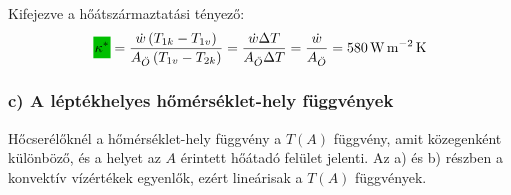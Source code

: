 Kifejezve a hőátszármaztatási tényező:
\begin{equation}
	\highlight{green!75!black}{\kappa^*} 
	= 
	\dfrac{\dot{w} \left(T_{1k} - T_{1v}\right)}{A_{\ddot{O}} \left(T_{1v} - T_{2k}\right)} 
	= 
	\dfrac{\dot{w} \Delta T}{A_{\ddot{O}} \Delta T} 
	= 
	\dfrac{\dot{w}}{A_{\ddot{O}}} = \SI{580}{\watt\per\meter\squared\kelvin}
\end{equation}

\subsubsection*{c) A léptékhelyes hőmérséklet-hely függvények}
Hőcserélőknél a hőmérséklet-hely függvény a $T\!\left(A\right)$ függvény, amit közegenként különböző, és a helyet az $A$ érintett hőátadó felület jelenti. Az a) és b) részben a konvektív vízértékek egyenlők, ezért lineárisak a $T\!\left(A\right)$ függvények.

